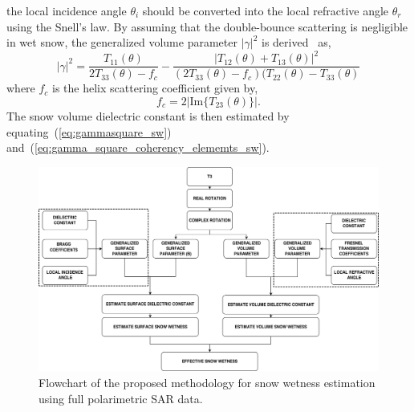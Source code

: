 the local incidence angle $\theta_{i}$ should be converted into the local refractive angle $\theta_{r}$ using the Snell's law.
By assuming that the double-bounce scattering is negligible in wet snow, the generalized volume parameter $|\gamma|^2$ is derived~\cite{singh2013b} as,
\begin{equation}
|\gamma|^2 = \frac{T_{11}(\theta)}{2T_{33}(\theta)-f_c} - \frac{|T_{12}(\theta)+T_{13}(\theta)|^{2}}{(2T_{33}(\theta)-f_{c})(T_{22}(\theta)-T_{33}(\theta)}
\label{eq:gamma_square_coherency_elememts_sw}
\end{equation}
where $f_{c}$ is the helix scattering coefficient given by,
\begin{equation}
f_{c}=2|\mbox{Im}\{T_{23}(\theta)\}|.
\label{eq:helix_scattering_coefficient_sw}
\end{equation}
The snow volume dielectric constant is then estimated by equating~(\ref{eq:gammasquare_sw}) and~(\ref{eq:gamma_square_coherency_elememts_sw}).   

\begin{figure}
		\centering
		\includegraphics[width=0.85\columnwidth]{Figures/flow_chart_1}
		\caption{Flowchart of the proposed methodology for snow wetness estimation using full polarimetric SAR data.}
		\label{fig:fullpol_methodology}
\end{figure}

